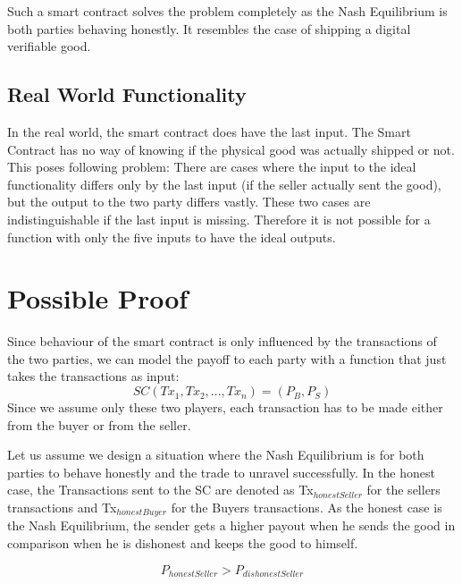 \documentclass{cacthesis}
\begin{document}
Such a smart contract solves the problem completely as the Nash Equilibrium is both parties behaving honestly.%
It resembles the case of shipping a digital verifiable good. %

\subsection{Real World Functionality}
In the real world, the smart contract does have the last input. The Smart Contract has no way of knowing if the physical good was actually shipped or not. \newline
This poses following problem: There are cases where the input to the ideal functionality differs only by the last input (if the seller actually sent the good), but the output to the two party differs vastly. These two cases are indistinguishable if the last input is missing. Therefore it is not possible for a function with only the five inputs to have the ideal outputs.

\section{Possible Proof}
Since behaviour of the smart contract is only influenced by the transactions of the two parties, we can model the payoff to each party with a function that just takes the transactions as input:
\begin{equation}
    SC(Tx_1, Tx_2,...,Tx_n) = (P_B, P_S)
\end{equation}
Since we assume only these two players, each transaction has to be made either from the buyer or from the seller.\newline



Let us assume we design a situation where the Nash Equilibrium is for both parties to behave honestly and the trade to unravel successfully. In the honest case, the Transactions sent to the SC are denoted as Tx$_{honestSeller}$ for the sellers transactions and Tx$_{honestBuyer}$ for the Buyers transactions. \newline
As the honest case is the Nash Equilibrium, the sender gets a higher payout when he sends the good in comparison when he is dishonest and keeps the good to himself.

\begin{equation}
    P_{honestSeller} > P_{dishonestSeller}
\end{equation}
\end{document}
